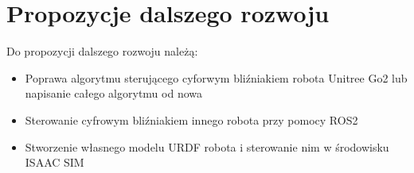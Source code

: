 \documentclass[12pt]{article}
\begin{document}
\section{Propozycje dalszego rozwoju}

Do propozycji dalszego rozwoju należą:
\begin{itemize}
    \item Poprawa algorytmu sterującego cyforwym bliźniakiem robota Unitree Go2 lub napisanie całego algorytmu od nowa
    \item Sterowanie cyfrowym bliźniakiem innego robota przy pomocy ROS2
    \item Stworzenie własnego modelu URDF robota i sterowanie nim w środowisku ISAAC SIM   
\end{itemize}
\end{document}
